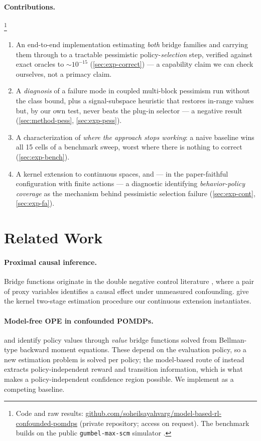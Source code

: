 \documentclass{article}
\theoremstyle{plain}
\theoremstyle{definition}
\begin{document}
\paragraph{Contributions.}\footnote{Code and raw results:
\url{github.com/soheilsayahvarg/model-based-rl-confounded-pomdps} (private
repository; access on request). The benchmark builds on the public
\texttt{gumbel-max-scm} simulator \citep{oberst2019}.}
\begin{enumerate}\itemsep2pt \parskip0pt 
\item An end-to-end implementation estimating \emph{both} bridge families and
carrying them through to a tractable pessimistic policy-\emph{selection} step,
verified against exact oracles to $\sim\!10^{-15}$ (\cref{sec:exp-correct}) --- a
capability claim we can check ourselves, not a primacy claim.
\item A \emph{diagnosis} of a failure mode in coupled multi-block pessimism run
without the class bound, plus a signal-subspace heuristic that restores in-range
values but, by our own test, never beats the plug-in selector --- a negative
result (\cref{sec:method-pess}, \cref{sec:exp-pess}).
\item A characterization of \emph{where the approach stops working}: a naive
baseline wins all 15 cells of a benchmark sweep, worst where there is nothing to
correct (\cref{sec:exp-bench}).
\item A kernel extension to continuous spaces, and --- in the paper-faithful
configuration with finite actions --- a diagnostic identifying
\emph{behavior-policy coverage} as the mechanism behind pessimistic selection
failure (\cref{sec:exp-cont}, \cref{sec:exp-fa}).
\end{enumerate}

\section{Related Work}
\label{sec:related}

\paragraph{Proximal causal inference.} Bridge functions originate in the double
negative control literature \citep{miao2018,tchetgen2020}, where a pair of proxy
variables identifies a causal effect under unmeasured confounding.
\citet{mastouri2021} give the kernel two-stage estimation procedure our
continuous extension instantiates.

\paragraph{Model-free OPE in confounded POMDPs.} \citet{shi2022} and
\citet{bennett2024} identify policy values through \emph{value} bridge functions
solved from Bellman-type backward moment equations. These depend on the
evaluation policy, so a new estimation problem is solved per policy; the
model-based route of \citet{hong2024} instead extracts policy-independent reward
and transition information, which is what makes a policy-independent confidence
region possible. We implement \citet{shi2022} as a competing baseline.
\end{document}

